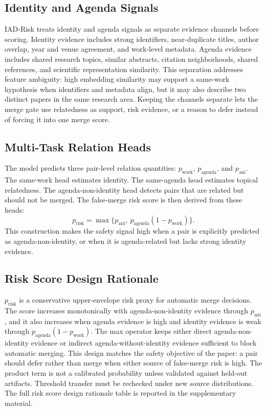 \documentclass[11pt]{article}
\begin{document}
\subsection{Identity and Agenda Signals}

IAD-Risk treats identity and agenda signals as separate evidence channels before scoring. Identity evidence includes strong identifiers, near-duplicate titles, author overlap, year and venue agreement, and work-level metadata. Agenda evidence includes shared research topics, similar abstracts, citation neighborhoods, shared references, and scientific representation similarity. This separation addresses feature ambiguity: high embedding similarity may support a same-work hypothesis when identifiers and metadata align, but it may also describe two distinct papers in the same research area. Keeping the channels separate lets the merge gate use relatedness as support, risk evidence, or a reason to defer instead of forcing it into one merge score.

\subsection{Multi-Task Relation Heads}

The model predicts three pair-level relation quantities: $p_{\mathrm{work}}$, $p_{\mathrm{agenda}}$, and $p_{\mathrm{ani}}$. The same-work head estimates identity. The same-agenda head estimates topical relatedness. The agenda-non-identity head detects pairs that are related but should not be merged. The false-merge risk score is then derived from these heads:
\[
p_{\mathrm{risk}}=\max\{p_{\mathrm{ani}},\ p_{\mathrm{agenda}}(1-p_{\mathrm{work}})\}.
\]
This construction makes the safety signal high when a pair is explicitly predicted as agenda-non-identity, or when it is agenda-related but lacks strong identity evidence.

\subsection{Risk Score Design Rationale}

$p_{\mathrm{risk}}$ is a conservative upper-envelope risk proxy for automatic merge decisions. The score increases monotonically with agenda-non-identity evidence through $p_{\mathrm{ani}}$, and it also increases when agenda evidence is high and identity evidence is weak through $p_{\mathrm{agenda}}(1-p_{\mathrm{work}})$. The max operator keeps either direct agenda-non-identity evidence or indirect agenda-without-identity evidence sufficient to block automatic merging. This design matches the safety objective of the paper: a pair should defer rather than merge when either source of false-merge risk is high. The product term is not a calibrated probability unless validated against held-out artifacts. Threshold transfer must be rechecked under new source distributions. The full risk score design rationale table is reported in the supplementary material.
\end{document}
